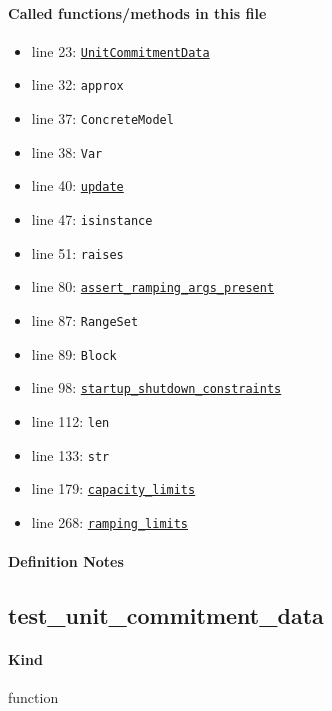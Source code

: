 \documentclass[11pt]{report}
\begin{document}
\paragraph{Called functions/methods in this file}
\begin{itemize}[leftmargin=*]
  \item line 23: \hyperref[def:pricetaker-unit_commitment.py:UnitCommitmentData:L26]{\texttt{UnitCommitmentData}}
  \item line 32: \texttt{approx}
  \item line 37: \texttt{ConcreteModel}
  \item line 38: \texttt{Var}
  \item line 40: \hyperref[def:pricetaker-unit_commitment.py:UnitCommitmentData.update:L84]{\texttt{update}}
  \item line 47: \texttt{isinstance}
  \item line 51: \texttt{raises}
  \item line 80: \hyperref[def:pricetaker-unit_commitment.py:UnitCommitmentData.assert_ramping_args_present:L116]{\texttt{assert\_ramping\_args\_present}}
  \item line 87: \texttt{RangeSet}
  \item line 89: \texttt{Block}
  \item line 98: \hyperref[def:pricetaker-unit_commitment.py:startup_shutdown_constraints:L137]{\texttt{startup\_shutdown\_constraints}}
  \item line 112: \texttt{len}
  \item line 133: \texttt{str}
  \item line 179: \hyperref[def:pricetaker-unit_commitment.py:capacity_limits:L180]{\texttt{capacity\_limits}}
  \item line 268: \hyperref[def:pricetaker-unit_commitment.py:ramping_limits:L205]{\texttt{ramping\_limits}}
\end{itemize}
\paragraph{Definition Notes}
\subsection{test\_unit\_commitment\_data}
\label{def:pricetaker-tests-test_unit_commitment.py:test_unit_commitment_data:L21}
\paragraph{Kind} function
\end{document}
